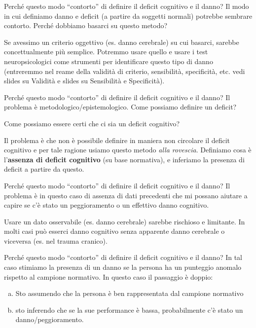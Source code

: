 \documentclass[
  ignorenonframetext,
  aspectratio=169,
]{beamer}
\begin{document}
\begin{frame}{Perché questo modo ``contorto'' di definire il deficit
cognitivo e il danno?}
\label{perchuxe9-questo-modo-contorto-di-definire-il-deficit-cognitivo-e-il-danno}
Il modo in cui definiamo danno e deficit (a partire da soggetti normali)
potrebbe sembrare contorto. Perché dobbiamo basarci su questo metodo?

Se avessimo un criterio oggettivo (es. danno cerebrale) su cui basarci,
sarebbe concettualmente più semplice. Potremmo usare quello e usare i
test neuropsicologici come strumenti per identificare questo tipo di
danno (entreremmo nel reame della validità di criterio, sensibilità,
specificità, etc. vedi slides su Validità e slides su Sensibilità e
Specificità).
\end{frame}

\begin{frame}{Perché questo modo ``contorto'' di definire il deficit
cognitivo e il danno?}
\label{perchuxe9-questo-modo-contorto-di-definire-il-deficit-cognitivo-e-il-danno-1}
Il problema è metodologico/epistemologico. Come possiamo definire un
deficit?

Come possiamo essere certi che ci sia un deficit cognitivo?

Il problema è che non è possibile definire in maniera non circolare il
deficit cognitivo e per tale ragione usiamo questo metodo \emph{alla
rovescia}. Definiamo cosa è l'\textbf{assenza di deficit cognitivo} (su
base normativa), e inferiamo la presenza di deficit a partire da questo.
\end{frame}

\begin{frame}{Perché questo modo ``contorto'' di definire il deficit
cognitivo e il danno?}
\label{perchuxe9-questo-modo-contorto-di-definire-il-deficit-cognitivo-e-il-danno-2}
Il problema è in questo caso di assenza di dati precedenti che mi
possano aiutare a capire se c'è stato un peggioramento o un effettivo
danno cognitivo.

Usare un dato osservabile (es. danno cerebrale) sarebbe rischioso e
limitante. In molti casi può esserci danno cognitivo senza apparente
danno cerebrale o viceversa (es. nel trauma cranico).
\end{frame}

\begin{frame}{Perché questo modo ``contorto'' di definire il deficit
cognitivo e il danno?}
\label{perchuxe9-questo-modo-contorto-di-definire-il-deficit-cognitivo-e-il-danno-3}
In tal caso stimiamo la presenza di un danno se la persona ha un
punteggio anomalo rispetto al campione normativo. In questo caso il
passaggio è doppio:

\begin{enumerate}
[a)]
\item
  Sto assumendo che la persona è ben rappresentata dal campione
  normativo
\item
  sto inferendo che se la sue performance è bassa, probabilmente c'è
  stato un danno/peggioramento.
\end{enumerate}
\end{frame}
\end{document}
